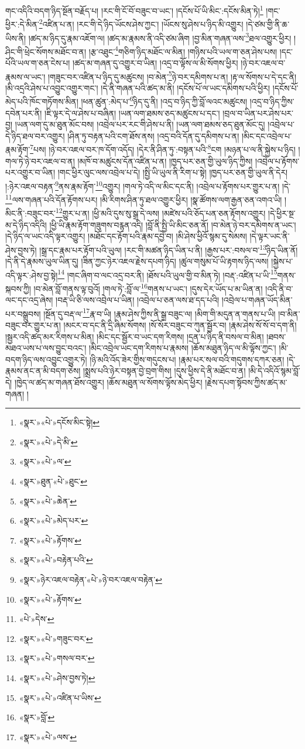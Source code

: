 གང་འདིའི་བདག་ཉིད་སྔོན་བརྗོད་པ། །རང་གི་ངོ་བོ་བཟུང་བ་ཡང་། །དངོས་པོ་ཡི་མིང་:དངོས་མིན་ཏེ།\footnote{«སྣར་»«པེ་»དངོས་མིང་སྟེ།} །གང་ཕྱིར་:དེ་མིན་\footnote{«སྣར་»«པེ་»དེ་མི་}འཛིན་པ་ན། །རང་གི་དེ་ཉིད་ཡོངས་ཤེས་ཀྱང་། །ཡོངས་སུ་ཤེས་པ་ཉིད་མི་འགྱུར། །དེ་ཙམ་གྱི་ནི་ཆ་ཡིས་ནི། །ཚད་མ་ཉིད་དུ་རྣམ་འཇོག་ལ། །ཚད་མ་རྣམས་ནི་འདི་ཙམ་ཞིག །བྱ་མིན་གཞན་ལས་\footnote{«སྣར་»«པེ་»ལ་}ཐལ་འགྱུར་ཕྱིར། །ཤིང་གི་ཕྲེང་སོགས་མཐོང་བ་ན། །རྩ་འཐུང་\footnote{«སྣར་»ཐུན་«པེ་»ཐུང་}གཅིག་ཉིད་མཐོང་ལ་མིན། །གཉིས་པའི་ཡལ་ག་ཅན་ཤེས་པས། །དང་པོའི་ཡལ་ག་ཅན་ངེས་པ། །ཚད་མ་གཞན་དུ་འགྱུར་བ་ཡིན། །འདྲ་བ་ལྟོས་ལ་མི་སོགས་ཕྱིར། །ཉེ་བར་འཇལ་བ་རྣམས་ལ་ཡང་། །གཟུང་བར་འཛིན་པ་ཉིད་དུ་མཚུངས། །བ་མེན་\footnote{«སྣར་»«པེ་»ཆེན་}ཉེ་བར་དམིགས་པ་ན། །རྟ་ལ་སོགས་པ་དེ་དང་ནི། །མི་འདྲའི་ཤེས་པ་འབྱུང་འགྱུར་གང་། །དེ་ནི་གཞན་པའི་ཚད་མ་ནི། །དངོས་པོ་ལ་ཡང་དམིགས་པའི་ཕྱིར། །དངོས་པོ་མེད་པའི་ཁོང་གཏོགས་མིན། །ཕན་ཚུན་:མེད་པ་\footnote{«སྣར་»«པེ་»མེད་པར་}ཉིད་དུ་ནི། །འདྲ་བ་ཉིད་ཀྱི་བློ་ལའང་མཚུངས། །འདྲ་བ་ཉིད་ཀྱིས་དབེན་པར་ནི། །ཇི་ལྟར་དེ་ལ་ཤེས་པ་བཞིན། །ཡན་ལག་ཐམས་ཅད་མཚུངས་པ་དང་། །བྲལ་བ་ཡིན་པར་ཤེས་པར་བྱ། །ཡན་ལག་དུ་མ་ཐུན་མོང་བས། །འབྲེལ་པར་རང་གི་ཤེས་པ་ནི། །ཡན་ལག་ཐམས་ཅད་ཐུན་མོང་དུ། །འབྲེལ་པ་དེ་ཉིད་ཐལ་བར་འགྱུར། །ཤིན་ཏུ་བརྟན་པའི་ངག་ཐོས་ནས། །འདྲ་བའི་དོན་དུ་དམིགས་པ་ན། །མིང་དང་འབྲེལ་པ་རྣམ་རྟོག་\footnote{«སྣར་»«པེ་»རྟོགས་}པས། །ཉེ་བར་འཇལ་བར་ཁ་དོག་འདོད། །དེར་ནི་ཤིན་ཏུ་:བསྟན་པའི་\footnote{«སྣར་»«པེ་»བརྟེན་པའི་}ངག །མཉན་པ་ལ་ནི་སྐྱེས་པ་ཉིད། །གལ་ཏེ་ཉེ་བར་འཇལ་བ་ན། །མཁོ་བ་མཚུངས་དོན་འཛིན་པ་ན། །ཁྱད་པར་ཅན་གྱི་ཡུལ་ཉིད་ཀྱིས། །འབྲེལ་པ་རྟོགས་པར་འགྱུར་བ་ཡིན། །གང་ཕྱིར་ལུང་ལས་འབྲེལ་པ་དེ། །སྤྱི་ཡི་ཡུལ་ནི་རིག་པ་སྟེ། །ཁྱད་པར་ཅན་གྱི་ཡུལ་ནི་དེར། །:ཉེར་འཇལ་བརྟན་\footnote{«སྣར་»ཉེར་འཇལ་བརྟེན་«པེ་»ཉེ་བར་འཇལ་བརྟེན་}ནས་རྣམ་རྟོག་\footnote{«སྣར་»«པེ་»རྟོགས་}འགྱུར། །གལ་ཏེ་འདི་ལ་མིང་དང་ནི། །འབྲེལ་པ་རྟོགས་པར་གྱུར་པ་ན། །དེ་\footnote{«པེ་»དེས་}ལས་གཞན་པའི་དོན་རྟོགས་པར། །མི་རིགས་ཤིན་ཏུ་ཐལ་འགྱུར་ཕྱིར། །སྣ་ཚོགས་ལག་རྒྱན་ཅན་འགའ་ཡི། །
མིང་ནི་:བཟུང་བར་\footnote{«སྣར་»«པེ་»གཟུང་བར་}གྱུར་པ་ན། །ཕྱི་མའི་དུས་སུ་སྒྲ་དེ་ལས། །མཛེས་པའི་ཅོད་པན་ཅན་རྟོགས་འགྱུར། །དེ་ཕྱིར་སྔ་མ་དེ་ཉིད་འདིའི། །ཕྱི་ཡི་རྣམ་རྟོག་གཟུགས་བརྙན་འདི། །བློ་ནི་སྤྱི་ཡི་མིང་ཅན་ནོ། །བ་མེན་ཉེ་བར་དམིགས་ན་ཡང་། །དེ་ཉིད་ལ་ཡང་འདི་ལྟར་འགྱུར། །མཐོང་དང་རྟོག་པའི་རྣམ་དབྱེ་བ། །མི་ཤེས་ཕྱིའོ་སྙམ་དུ་སེམས། །དེ་ལྟར་ཡང་ནི་ཤེས་བྱས་ཏེ། །སྒྲ་དང་རྣམ་པར་རྟོག་པའི་ཡུལ། །རང་གི་མཚན་ཉིད་ཡིན་པ་ནི། །རྒྱས་པར་:བསལ་བ་\footnote{«སྣར་»«པེ་»གསལ་བར་}ཉིད་ཡིན་ནོ། །དེ་ནི་དེ་རྣམས་ཡུལ་ཡིན་དུ། །ཟིན་ཀྱང་ཉེར་འཇལ་རྗེས་དཔག་ཉིད། །ཚུལ་གསུམ་པོ་ཡི་རྟགས་ཉིད་ལས། །སྐྱེས་པ་འདི་ལྟར་:ཤེས་བྱ་སྟེ།\footnote{«སྣར་»«པེ་»ཤེས་བྱས་ཏེ།} །གང་ཞིག་བ་ལང་འདྲ་བར་ནི། །ཐོས་པའི་ཡུལ་གྱི་བ་མིན་ཏེ། །བརྡ་:འཛིན་པ་ཡི་\footnote{«སྣར་»«པེ་»འཛིན་པ་ཡིས་}གནས་སྐབས་ཀྱི། །བ་མེན་བློ་གནས་ལྟ་བུའོ། །གལ་ཏེ་:བློ་ལ་\footnote{«སྣར་»བློ་}གནས་པ་ཡང་། །དུས་དེར་ཡོད་པ་མ་ཡིན་ན། །འདི་ནི་བ་ལང་དང་འདྲ་ཞེས། །བརྡ་ཡི་ཅི་ལས་འབྲེལ་པ་ཡིན། །འབྲེལ་པ་ཅན་ལས་ཐ་དད་པའི། །འབྲེལ་པ་གཞན་ཡོད་མིན་པར་བསྒྲུབས། །སྔོན་དུ་བརྡ་ལ་\footnote{«སྣར་»«པེ་»ལས་}རྣ་བ་ཡི། །རྣམ་ཤེས་ཀྱིས་ནི་སྒྲ་བཟུང་ལ། །མིག་གི་མདུན་ན་གནས་པ་ཡི། །བ་མིན་བཟུང་བར་གྱུར་པ་ན། །མངར་བ་དང་ནི་དྲི་ཞིམ་སོགས། །སོ་སོར་བཟུང་བ་ཀུན་སྦྱོར་བ། །རྣམ་ཤེས་སོ་སོ་བ་དག་ནི། །སྦྱར་འདི་ཚད་མར་རིགས་པ་མིན། །མིང་དང་སྦྱོར་བ་ཡང་དག་རིགས། །དྲན་པ་ཉིད་ནི་བསལ་བ་མིན། །ཐབས་མཐའ་ཡས་པ་ལས་བྱུང་བའང་། །མིང་འབྲེལ་ཡང་དག་རིགས་པ་རྣམས། །ཆོས་མཐུན་ཉིད་ལ་མི་ལྟོས་ཀྱང་། །མི་བདག་ཉིད་ལས་འབྱུང་འགྱུར་ཏེ། །ཉི་མའི་འོད་ཟེར་གྱིས་གདུངས་པ། །རྣམ་པར་སལ་བའི་གདུགས་དཀར་ཅན། །དེ་རྣམས་ནང་ན་མི་བདག་ཅེས། །སྨྲས་པའི་ཉེར་བསྟན་བྱེ་བྲག་གིས། །དུས་ཕྱིས་དེ་ནི་མཐོང་བ་ན། །མི་དེ་འདིའོ་སྙམ་བློ་དེ། །ཁྱེད་ལ་ཚད་མ་གཞན་ཐོས་འགྱུར། །ཆོས་མཐུན་ལ་སོགས་ལྟོས་མེད་ཕྱིར། །རྗེས་དཔག་སྟོབས་ཀྱིས་ཚད་མ་གཞན། །
